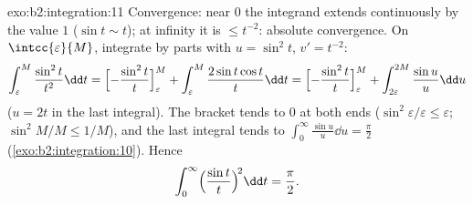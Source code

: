 \begin{solution}{exo:b2:integration:11}
Convergence: near $0$ the integrand extends continuously by the
value $1$ ($\sin t \sim t$); at infinity it is $\leq t^{-2}$:
absolute convergence. On $\intcc{\varepsilon}{M}$, integrate by
parts with $u = \sin^2 t$, $v' = t^{-2}$:
\[
\int_\varepsilon^M \frac{\sin^2 t}{t^2}\dd t
= \Bigl[-\frac{\sin^2 t}{t}\Bigr]_\varepsilon^M
+ \int_\varepsilon^M \frac{2\sin t\cos t}{t}\dd t
= \Bigl[-\frac{\sin^2 t}{t}\Bigr]_\varepsilon^M
+ \int_{2\varepsilon}^{2M} \frac{\sin u}{u}\dd u
\]
($u = 2t$ in the last integral). The bracket tends to $0$ at both
ends ($\sin^2\varepsilon/\varepsilon \leq \varepsilon$;
$\sin^2 M/M \leq 1/M$), and the last integral tends to
$\int_0^\infty \frac{\sin u}{u}\dd u = \frac\pi2$
(\cref{exo:b2:integration:10}). Hence
\[
\int_0^\infty \Bigl(\frac{\sin t}{t}\Bigr)^{\!2}\dd t
= \frac\pi2 .
\]
\end{solution}

